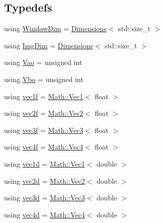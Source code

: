 \subsection*{Typedefs}
\begin{DoxyCompactItemize}
\item 
using \mbox{\hyperlink{namespace_saturn_a606451fdad804aef3b4f56f6805900f2}{Window\+Dim}} = \mbox{\hyperlink{struct_saturn_1_1_dimensions}{Dimensions}}$<$ std\+::size\+\_\+t $>$
\item 
using \mbox{\hyperlink{namespace_saturn_a8bd2b855a967447c8314c235470e0987}{Img\+Dim}} = \mbox{\hyperlink{struct_saturn_1_1_dimensions}{Dimensions}}$<$ std\+::size\+\_\+t $>$
\item 
using \mbox{\hyperlink{namespace_saturn_addda149ffd4b4d713a0da05381dd1855}{Vao}} = unsigned int
\item 
using \mbox{\hyperlink{namespace_saturn_aab7e2d9f83adaea6d8ca8151d1d8b490}{Vbo}} = unsigned int
\item 
using \mbox{\hyperlink{namespace_saturn_a81f7bc25d05c972721ab952eb8a50c21}{vec1f}} = \mbox{\hyperlink{namespace_saturn_1_1_math_acae4f808f0c3284d0b60ee1ac720deaa}{Math\+::\+Vec1}}$<$ float $>$
\item 
using \mbox{\hyperlink{namespace_saturn_aa55c3449edf84e0efc54c14c7c8e19d8}{vec2f}} = \mbox{\hyperlink{namespace_saturn_1_1_math_a8befc95aeff660bda92b8807c1cc5224}{Math\+::\+Vec2}}$<$ float $>$
\item 
using \mbox{\hyperlink{namespace_saturn_ac487f08aa215d1835c4859788e4e552a}{vec3f}} = \mbox{\hyperlink{namespace_saturn_1_1_math_af4a7a893730c64ac02b620f648cc5406}{Math\+::\+Vec3}}$<$ float $>$
\item 
using \mbox{\hyperlink{namespace_saturn_ac72dd80c10cd8042d762656b2793d36f}{vec4f}} = \mbox{\hyperlink{namespace_saturn_1_1_math_a311b3d690ef397050af7963caa08d1bd}{Math\+::\+Vec4}}$<$ float $>$
\item 
using \mbox{\hyperlink{namespace_saturn_a3c9b7582cbea7145f181c1b42b24709f}{vec1d}} = \mbox{\hyperlink{namespace_saturn_1_1_math_acae4f808f0c3284d0b60ee1ac720deaa}{Math\+::\+Vec1}}$<$ double $>$
\item 
using \mbox{\hyperlink{namespace_saturn_a30d3067013f535e483c2a1da724adf22}{vec2d}} = \mbox{\hyperlink{namespace_saturn_1_1_math_a8befc95aeff660bda92b8807c1cc5224}{Math\+::\+Vec2}}$<$ double $>$
\item 
using \mbox{\hyperlink{namespace_saturn_ad7ac3aac73d4094ccaed478f0b2c13b0}{vec3d}} = \mbox{\hyperlink{namespace_saturn_1_1_math_af4a7a893730c64ac02b620f648cc5406}{Math\+::\+Vec3}}$<$ double $>$
\item 
using \mbox{\hyperlink{namespace_saturn_acb87b8b4026beeda9cb50181bde1bd04}{vec4d}} = \mbox{\hyperlink{namespace_saturn_1_1_math_a311b3d690ef397050af7963caa08d1bd}{Math\+::\+Vec4}}$<$ double $>$
\end{DoxyCompactItemize}
